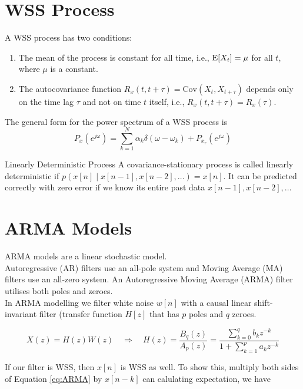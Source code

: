 \section{WSS Process}
A WSS process has two conditions:
\begin{enumerate}
    \item The mean of the process is constant for all time, i.e., \( \text{E}[X_t] = \mu \) for all \( t \), where \( \mu \) is a constant.
    \item The autocovariance function \( R_x(t, t+\tau) = \text{Cov}(X_t, X_{t+\tau}) \) depends only on the time lag \( \tau \) and not on time \( t \) itself, i.e., \( R_x(t, t+\tau) = R_x(\tau) \).
\end{enumerate}

The general form for the power spectrum of a WSS process is 
\begin{equation}
P_x(e^{j\omega})=\sum_{k=1}^N\alpha_k\delta(\omega-\omega_k)+P_{x_r}(e^{j\omega})
\end{equation}

\begin{definitionbox}{Linearly Deterministic Process}
    A covariance-stationary process is called linearly deterministic if $p(x[n]\mid x[n-1],x[n-2],\ldots)=x[n].$ It can be predicted correctly with zero error if we know its entire past data $x[n-1],x[n-2],\ldots$
\end{definitionbox}

\section{ARMA Models}
ARMA models are a linear stochastic model.\\

Autoregressive (AR) filters use an all-pole system and Moving Average (MA) filters use an all-zero system. An Autoregressive Moving Average (ARMA) filter utilises both poles and zeroes.\\

In ARMA modelling we filter white noise $w[n]$ with a causal linear shift-invariant filter (transfer function $H[z]$ that has $p$ poles and  $q$ zeroes. 

\begin{equation}\label{eq:ARMA}
    X(z)=H(z)W(z)\quad\Rightarrow\quad H(z)=\frac{B_q(z)}{A_p(z)}=\frac{\sum_{k=0}^qb_kz^{-k}}{1+\sum_{k=1}^pa_kz^{-k}}
\end{equation}

If our filter is WSS, then $x[n]$ is WSS as well. To show this, multiply both sides of Equation \ref{eq:ARMA} by $x[n-k]$ can calulating expectation, we have

